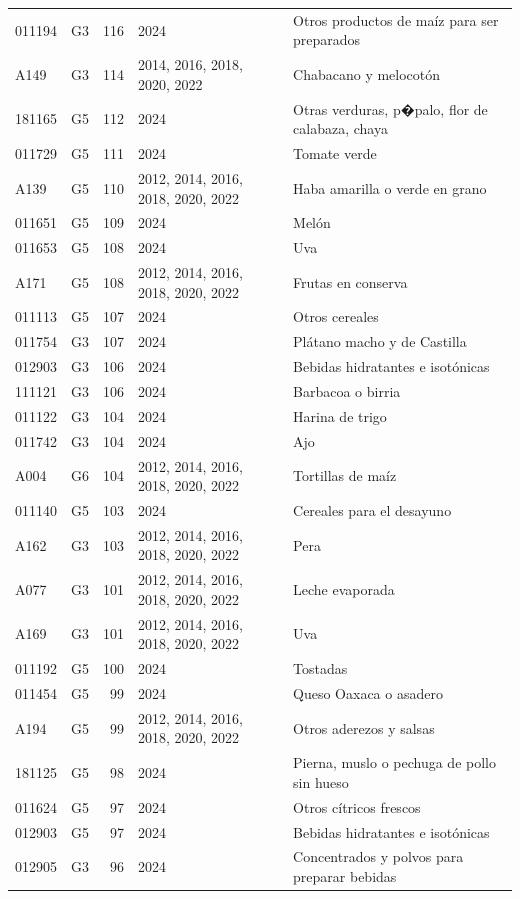\begin{table}[ht]
\begin{tabular}{llrll}
  011194 & G3 & 116 & 2024 & Otros productos de maíz para ser preparados \\ 
  A149 & G3 & 114 & 2014, 2016, 2018, 2020, 2022 & Chabacano y melocotón \\ 
  181165 & G5 & 112 & 2024 & Otras verduras, p�palo, flor de calabaza, chaya \\ 
  011729 & G5 & 111 & 2024 & Tomate verde \\ 
  A139 & G5 & 110 & 2012, 2014, 2016, 2018, 2020, 2022 & Haba amarilla o verde en grano \\ 
  011651 & G5 & 109 & 2024 & Melón \\ 
  011653 & G5 & 108 & 2024 & Uva \\ 
  A171 & G5 & 108 & 2012, 2014, 2016, 2018, 2020, 2022 & Frutas en conserva \\ 
  011113 & G5 & 107 & 2024 & Otros cereales \\ 
  011754 & G3 & 107 & 2024 & Plátano macho y de Castilla \\ 
  012903 & G3 & 106 & 2024 & Bebidas hidratantes e isotónicas \\ 
  111121 & G3 & 106 & 2024 & Barbacoa o birria \\ 
  011122 & G3 & 104 & 2024 & Harina de trigo \\ 
  011742 & G3 & 104 & 2024 & Ajo \\ 
  A004 & G6 & 104 & 2012, 2014, 2016, 2018, 2020, 2022 & Tortillas de maíz \\ 
  011140 & G5 & 103 & 2024 & Cereales para el desayuno \\ 
  A162 & G3 & 103 & 2012, 2014, 2016, 2018, 2020, 2022 & Pera \\ 
  A077 & G3 & 101 & 2012, 2014, 2016, 2018, 2020, 2022 & Leche evaporada \\ 
  A169 & G3 & 101 & 2012, 2014, 2016, 2018, 2020, 2022 & Uva \\ 
  011192 & G5 & 100 & 2024 & Tostadas \\ 
  011454 & G5 &  99 & 2024 & Queso Oaxaca o asadero \\ 
  A194 & G5 &  99 & 2012, 2014, 2016, 2018, 2020, 2022 & Otros aderezos y salsas \\ 
  181125 & G5 &  98 & 2024 & Pierna, muslo o pechuga de pollo sin hueso \\ 
  011624 & G5 &  97 & 2024 & Otros cítricos frescos \\ 
  012903 & G5 &  97 & 2024 & Bebidas hidratantes e isotónicas \\ 
  012905 & G3 &  96 & 2024 & Concentrados y polvos para preparar bebidas \\ 

\end{tabular}
\end{table}
